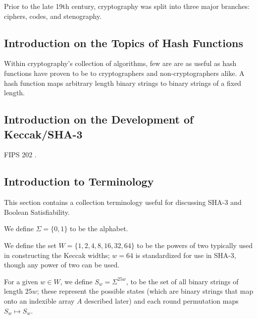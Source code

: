 \documentclass[10pt,twocolumn,twoside]{pnas-new}
\begin{document}
    Prior to the late 19th century, cryptography was split into three major
branches: ciphers, codes, and stenography.



%

\subsection{Introduction on the Topics of Hash Functions} \label{sec:i:hash}

    Within cryptography's collection of algorithms, few are are as useful as
hash functions have proven to be to cryptographers and non-cryptographers
alike. A hash function maps arbitrary length binary strings to binary strings
of a fixed length.


\subsection{Introduction on the Development of Keccak/SHA-3} \label{sec:i:keccak}

    FIPS 202 \cite{NIST202}.



\subsection{Introduction to Terminology} \label{sec:i:terminology}

This section contains a collection terminology useful for discussing SHA-3
and Boolean Satisfiability.

We define $\Sigma = \{0, 1\}$ to be the alphabet.

We define the set $W = \{1, 2, 4, 8, 16, 32, 64\}$ to be the powers of two
typically used in constructing the Keccak widths; $w=64$ is standardized for
use in SHA-3, though any power of two can be used.

For a given $w \in W$, we define $S_{w} = \Sigma^{25w}$, to be the set of
all binary strings of length $25w$; these represent the possible states (which
are binary strings that map onto an indexible array $A$ described later) and each
round permutation maps $S_{w} \mapsto S_{w}$.
\end{document}
